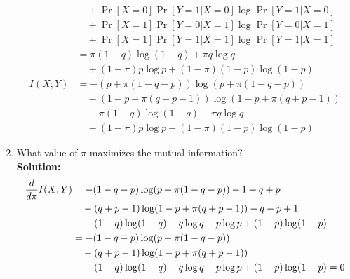 \documentclass{assignment}
\begin{document}
\begin{enumerate}
\begin{align*}
           & \quad + \Pr[X=0]\Pr[Y=1|X=0] \log \Pr[Y=1|X=0] \\
           & \quad + \Pr[X=1]\Pr[Y=0|X=1] \log \Pr[Y=0|X=1] \\
           & \quad + \Pr[X=1]\Pr[Y=1|X=1] \log \Pr[Y=1|X=1] \\
           & = \pi (1 - q) \log (1 - q)  + \pi q \log q \\
           & \quad + (1 - \pi) p \log p + (1 - \pi) (1 - p) \log (1 - p) \\
    I(X;Y) & = - (p + \pi (1 - q - p)) \log (p + \pi (1 - q - p)) \\
           & \quad - (1 - p + \pi (q + p - 1)) \log (1 - p + \pi (q + p - 1)) \\
           & \quad - \pi (1 - q) \log (1 - q)  - \pi q \log q \\
           & \quad - (1 - \pi) p \log p - (1 - \pi) (1 - p) \log (1 - p)
  \end{align*}
\item What value of $\pi$ maximizes the mutual information? \\
  \textbf{Solution:} \\
  \begin{align*}
    \dfrac{d}{d\pi} I(X;Y)
    & = -(1-q-p)\log (p + \pi (1 - q - p)) - 1 + q + p \\
    & \quad - (q + p - 1)\log (1 - p + \pi (q + p - 1)) - q - p + 1 \\
    & \quad - (1 - q) \log (1- q) - q \log q+ p \log p + (1 - p) \log (1 - p) \\
    & = -(1-q-p)\log (p + \pi (1 - q - p)) \\
    & \quad - (q + p - 1)\log (1 - p + \pi (q + p - 1)) \\
    & \quad - (1 - q) \log (1- q) - q \log q+ p \log p + (1 - p) \log (1 - p) = 0
  \end{align*}
\end{enumerate}
\end{document}

